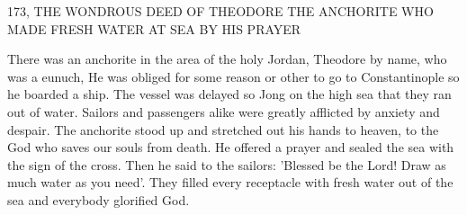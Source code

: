 173, THE WONDROUS DEED OF THEODORE
THE ANCHORITE WHO MADE FRESH WATER
AT SEA BY HIS PRAYER

There was an anchorite in the area of the holy Jordan, Theodore by
name, who was a eunuch, He was obliged for some reason or other
to go to Constantinople so he boarded a ship. The vessel was
delayed so Jong on the high sea that they ran out of water. Sailors
and passengers alike were greatly afflicted by anxiety and despair.
The anchorite stood up and stretched out his hands to heaven, to
the God who saves our souls from death. He offered a prayer and
sealed the sea with the sign of the cross. Then he said to the sailors:
'Blessed be the Lord! Draw as much water as you need'. They filled
every receptacle with fresh water out of the sea and everybody
glorified God.


